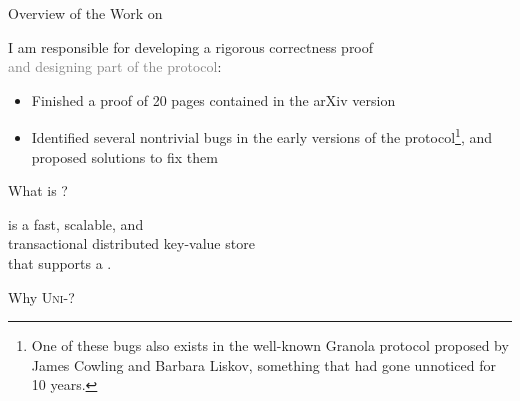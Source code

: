 \begin{frame}{Overview of the Work on \unistore}
  \begin{center}
    \vspace{0.20cm}
  \end{center}

  \pause
  \vspace{0.30cm}
  I am responsible for developing a rigorous correctness proof \\[3pt]
  \textcolor{gray}{\footnotesize and designing part of the protocol}:

  \pause
  \begin{itemize}[<+->]
    \item Finished a proof of 20 pages contained in the \textsf{arXiv} version
    \item Identified several nontrivial bugs in the early versions of the
          protocol\footnote{ One of these bugs also exists in the well-known Granola
            protocol proposed by James Cowling and Barbara Liskov, something that had gone
            unnoticed for 10 years.}, and proposed solutions to fix them
  \end{itemize}
\end{frame}

\begin{frame}{What is \unistore?}
  \begin{center}
    \unistore{} is a fast, scalable, and  \\[8pt]
    transactional distributed key-value store \\[8pt]
    that supports a .
  \end{center}
\end{frame}

\begin{frame}{Why \textsc{Uni-}?}
  \begin{center}


  \end{center}
\end{frame}


